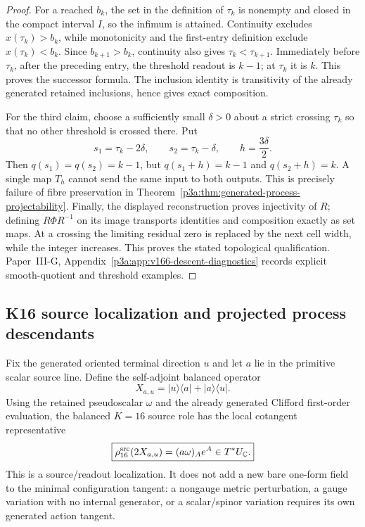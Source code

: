 \documentclass[12pt,a4paper]{article}
\begin{document}
\begin{proof}
For a reached \(b_k\), the set in the definition of \(\tau_k\) is nonempty
and closed in the compact interval \(I\), so the infimum is attained.
Continuity excludes \(x(\tau_k)>b_k\), while monotonicity and the first-entry
definition exclude \(x(\tau_k)<b_k\).  Since \(b_{k+1}>b_k\), continuity
also gives \(\tau_k<\tau_{k+1}\).  Immediately before \(\tau_k\), after the
preceding entry, the threshold readout is \(k-1\); at \(\tau_k\) it is \(k\).
This proves the successor formula.  The inclusion identity is transitivity of
the already generated retained inclusions, hence gives exact composition.

For the third claim, choose a sufficiently small \(\delta>0\) about a strict
crossing \(\tau_k\) so that no other threshold is crossed there.  Put
\[
 s_1=\tau_k-2\delta,
 \qquad s_2=\tau_k-\delta,
 \qquad h=\frac{3\delta}{2}.
\]
Then \(q(s_1)=q(s_2)=k-1\), but
\(q(s_1+h)=k-1\) and \(q(s_2+h)=k\).  A single map \(T_h\) cannot send the
same input to both outputs.  This is precisely failure of fibre preservation
in Theorem~\ref{p3a:thm:generated-process-projectability}.  Finally, the
displayed reconstruction proves injectivity of \(R\); defining
\(R\Phi R^{-1}\) on its image transports identities and composition exactly
as set maps. At a crossing the limiting residual zero is replaced by the next
cell width, while the integer increases. This proves the stated topological
qualification. Paper~III-G, Appendix~\ref{p3a:app:v166-descent-diagnostics} records
explicit smooth-quotient and threshold examples.
\end{proof}

\subsection{K16 source localization and projected process descendants}
\label{p3a:sec:v179-k16-source-localization}

Fix the generated oriented terminal direction $u$ and let $a$ lie in the
primitive scalar source line.  Define the self-adjoint balanced operator
\[
  X_{a,u}=|u\rangle\langle a|+|a\rangle\langle u|.
\]
Using the retained pseudoscalar $\omega$ and the already generated Clifford
first-order evaluation, the balanced $K=16$ source role has the local
cotangent representative
\[
 \boxed{\rho_{16}^{\rm src}(2X_{a,u})=(a\omega)_A e^A\in T^*U_{\mathbb C}.}
\]
This is a source/readout localization.  It does not add a new bare one-form
field to the minimal configuration tangent: a nongauge metric perturbation,
a gauge variation with no internal generator, or a scalar/spinor variation
requires its own generated action tangent.
\end{document}
